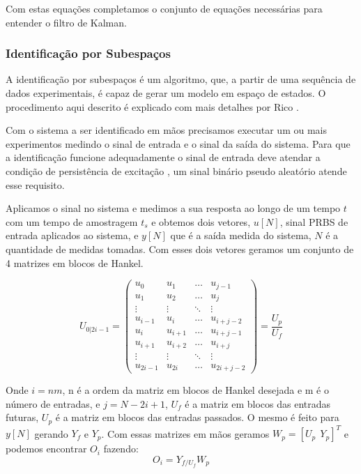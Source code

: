 Com estas equações completamos o conjunto de equações necessárias para entender o filtro de Kalman.

\subsubsection {Identificação por Subespaços}
A identificação por subespaços é um algoritmo, que, a partir de uma sequência de dados experimentais, é capaz de gerar um modelo em espaço de estados. O procedimento aqui descrito é explicado com mais detalhes por Rico \cite{ricco2012}.


Com o sistema a ser identificado em mãos precisamos executar um ou mais experimentos medindo o sinal de entrada e o sinal da saída do sistema. Para que a identificação funcione adequadamente o sinal de entrada deve atendar a condição de persistência de excitação \cite{katayama2005}, um sinal binário pseudo aleatório atende esse requisito.


Aplicamos o sinal no sistema e medimos a sua resposta ao longo de um tempo $t$ com um tempo de amostragem $t_s$ e obtemos dois vetores, $u[N]$, sinal PRBS de entrada aplicados ao sistema, e $y[N]$ que é a saída medida do sistema, $N$ é a quantidade de medidas tomadas. Com esses dois vetores geramos um conjunto de 4 matrizes em blocos de Hankel.

\begin{equation}\label{eq:matrizhankel}
U_{0|2i-1}=
\begin{pmatrix}
u_0 & u_1 & \dots & u_{j-1} \\
u_1 & u_2 & \dots & u_{j} \\
\vdots & \vdots & \ddots & \vdots\\
u_{i-1} & u_i & \dots & u_{i+j-2}\\
\hline
u_i & u_{i+1} & \dots & u_{i+j-1}\\
u_{i+1} & u_{i+2} & \dots & u_{i+j}\\
\vdots & \vdots & \ddots & \vdots\\
u_{2i-1} & u_{2i} & \dots & u_{2i+j-2}
\end{pmatrix}
=\dfrac{U_p}{U_f}
\end{equation}

Onde $i=nm$, n é a ordem da matriz em blocos de Hankel desejada e m é o número de entradas, e $j=N-2i+1$, $U_f$ é a matriz em blocos das entradas futuras, $U_p$ é a matriz em blocos das entradas passados. O mesmo é feito para $y[N]$ gerando $Y_f$ e $Y_p$. Com essas matrizes em mãos geramos $W_p=[U_p~~Y_p]^T$ e podemos encontrar $O_i$ fazendo:
\begin{equation}\label{eq:oi}
O_i=Y_{f/U_f} W_p
\end{equation}

